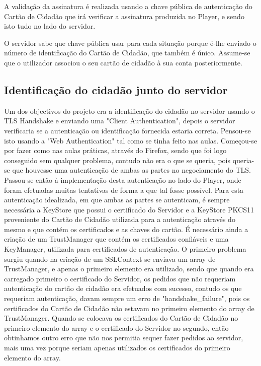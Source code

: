 \documentclass[pdftex,12pt,a4paper]{report}
\begin{document}
A validação da assinatura é realizada usando a chave pública de autenticação do Cartão de Cidadão que irá verificar a assinatura produzida no Player, e sendo isto tudo no lado do servidor. 

O servidor sabe que chave pública usar para cada situação porque é-lhe enviado o número de identificação do Cartão de Cidadão, que também é único. Assume-se que o utilizador associou o seu cartão de cidadão à sua conta posteriormente.

\subsection{Identificação do cidadão junto do servidor}
Um dos objectivos do projeto era a identificação do cidadão no servidor usando o TLS Handshake e enviando uma "Client Authentication", depois o servidor verificaria se a autenticação ou identificação fornecida estaria correta. Pensou-se isto usando a "Web Authentication" tal como se tinha feito nas aulas.
Começou-se por fazer como nas aulas práticas, através do Firefox, sendo que foi logo conseguido sem qualquer problema, contudo não era o que se queria, pois queria-se que houvesse uma autenticação de ambas as partes no negociamento do TLS. 
Passou-se então à implementação desta autenticação no lado do Player, onde foram efetuadas muitas tentativas de forma a que tal fosse possível. 
Para esta autenticação idealizada, em que ambas as partes se autenticam, é sempre necessária a KeyStore que possui o certificado do Servidor e a KeyStore PKCS11 proveniente do Cartão de Cidadão utilizada para a autenticação através do mesmo e que contém os certificados e as chaves do cartão.
É necessário ainda a criação de um TrustManager que contém os certificados confiáveis e uma KeyManager, utilizada para certificados de autenticação.
O primeiro problema surgiu quando na criação de um SSLContext se enviava um array de TrustManager, e apenas o primeiro elemento era utilizado, sendo que quando era carregado primeiro o certificado do Servidor, os pedidos que não requeriam autenticação do cartão de cidadão era efetuados com sucesso, contudo os que requeriam autenticação, davam sempre um erro de "handshake\_failure", pois os certificados do Cartão de Cidadão não estavam no primeiro elemento do array de TrustManager. Quando se colocava os certificados do Cartão de Cidadão no primeiro elemento do array e o certificado do Servidor no segundo, então obtinhamos outro erro que não nos permitia sequer fazer pedidos ao servidor, mais uma vez porque seriam apenas utilizados os certificados do primeiro elemento do array.
\end{document}

